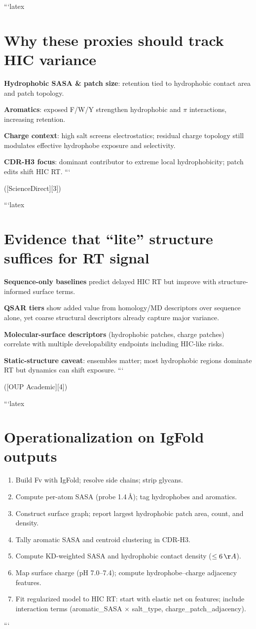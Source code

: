 ```latex
\section*{Why these proxies should track HIC variance}

\textbf{Hydrophobic SASA \& patch size}: retention tied to hydrophobic contact area and patch topology.

\textbf{Aromatics}: exposed F/W/Y strengthen hydrophobic and $\pi$ interactions, increasing retention.

\textbf{Charge context}: high salt screens electrostatics; residual charge topology still modulates effective hydrophobe exposure and selectivity.

\textbf{CDR-H3 focus}: dominant contributor to extreme local hydrophobicity; patch edits shift HIC RT.
```

([ScienceDirect][3])

```latex
\section*{Evidence that “lite” structure suffices for RT signal}

\textbf{Sequence-only baselines} predict delayed HIC RT but improve with structure-informed surface terms.

\textbf{QSAR tiers} show added value from homology/MD descriptors over sequence alone, yet coarse structural descriptors already capture major variance.

\textbf{Molecular-surface descriptors} (hydrophobic patches, charge patches) correlate with multiple developability endpoints including HIC-like risks.

\textbf{Static-structure caveat}: ensembles matter; most hydrophobic regions dominate RT but dynamics can shift exposure.
```

([OUP Academic][4])

```latex
\section*{Operationalization on IgFold outputs}

\begin{enumerate}\itemsep0.2em
\item Build Fv with IgFold; resolve side chains; strip glycans.
\item Compute per-atom SASA (probe 1.4\,\AA); tag hydrophobes and aromatics.
\item Construct surface graph; report largest hydrophobic patch area, count, and density.
\item Tally aromatic SASA and centroid clustering in CDR-H3.
\item Compute KD-weighted SASA and hydrophobic contact density ($\le6\,\AA$).
\item Map surface charge (pH 7.0–7.4); compute hydrophobe–charge adjacency features.
\item Fit regularized model to HIC RT: start with elastic net on features; include interaction terms (aromatic\_SASA $\times$ salt\_type, charge\_patch\_adjacency).
\end{enumerate}
```

